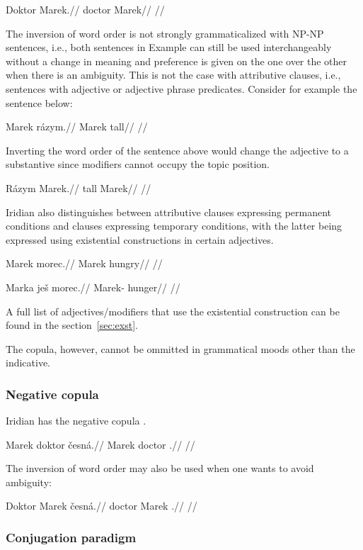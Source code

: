 \a
\begingl
\gla Doktor Marek.//
\glb doctor Marek//
\glft {}//
\endgl

\xe

The inversion of word order is not strongly grammaticalized with NP-NP
sentences, i.e., both sentences in Example  can still be used
interchangeably without a change in meaning and preference is given on the one
over the other when there is an ambiguity. This is not the case with attributive
clauses, i.e., sentences with adjective or adjective phrase predicates. Consider
for example the sentence below:

\pex
\begingl
\gla Marek rázym.//
\glb Marek tall//
\glft {}//
\endgl
\xe

Inverting the word order of the sentence above would change the adjective to a
substantive since modifiers cannot occupy the topic position.

\pex
\begingl
\gla Rázym Marek.//
\glb tall Marek//
\glft {}//
\endgl
\xe

Iridian also distinguishes between attributive clauses expressing permanent
conditions and clauses expressing temporary conditions, with the latter being
expressed using existential constructions in certain adjectives.

\pex
\begingl
\gla *Marek morec.//
\glb Marek hungry//
\glft {}//
\endgl
\xe


\pex
\begingl
\gla Marka ješ morec.//
\glb Marek-\Acc{} \Exst{} hunger//
\glft {}//
\endgl
\xe

A full list of adjectives/modifiers that use the existential construction can be
found in the section~\ref{sec:exst}.

The copula, however, cannot be ommitted in grammatical moods other than the
indicative.

\subsubsection{Negative copula}

Iridian has the negative copula .

\pex
\begingl
\gla Marek doktor česná.//
\glb Marek doctor \Cop{}.\Neg{}//
\glft {}//
\endgl
\xe

The inversion of word order may also be used when one wants to avoid ambiguity:

\pex
\begingl
\gla Doktor Marek česná.//
\glb doctor Marek \Cop{}.\Neg{}//
\glft {}//
\endgl
\xe


\subsubsection{Conjugation paradigm}
